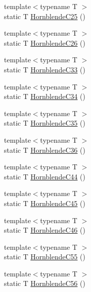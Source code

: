 \begin{DoxyCompactItemize}
\item 
{\footnotesize template$<$typename T $>$ }\\static T \mbox{\hyperlink{namespacempc_1_1data_ab66bbf01d7d0864eb98b3fa93260a745}{Hornblende\+C25}} ()
\item 
{\footnotesize template$<$typename T $>$ }\\static T \mbox{\hyperlink{namespacempc_1_1data_afe3ff9d089373edc9f59f18cf332d248}{Hornblende\+C26}} ()
\item 
{\footnotesize template$<$typename T $>$ }\\static T \mbox{\hyperlink{namespacempc_1_1data_a633fd0ce53057d818dcbb260ee8fa620}{Hornblende\+C33}} ()
\item 
{\footnotesize template$<$typename T $>$ }\\static T \mbox{\hyperlink{namespacempc_1_1data_af11fafc727d70478d7a0ee0c7f1bdffd}{Hornblende\+C34}} ()
\item 
{\footnotesize template$<$typename T $>$ }\\static T \mbox{\hyperlink{namespacempc_1_1data_a2f318bf2ce6b8bdea77f99f8e20329e8}{Hornblende\+C35}} ()
\item 
{\footnotesize template$<$typename T $>$ }\\static T \mbox{\hyperlink{namespacempc_1_1data_a58a1073e772be2c543e3a3ce756e08bf}{Hornblende\+C36}} ()
\item 
{\footnotesize template$<$typename T $>$ }\\static T \mbox{\hyperlink{namespacempc_1_1data_a711981c0ab9a31709771931c708bc731}{Hornblende\+C44}} ()
\item 
{\footnotesize template$<$typename T $>$ }\\static T \mbox{\hyperlink{namespacempc_1_1data_a8b2f87bf61968a18585675bdc0f01c3b}{Hornblende\+C45}} ()
\item 
{\footnotesize template$<$typename T $>$ }\\static T \mbox{\hyperlink{namespacempc_1_1data_af79af0cf116ff23799fbe84e629d2d6e}{Hornblende\+C46}} ()
\item 
{\footnotesize template$<$typename T $>$ }\\static T \mbox{\hyperlink{namespacempc_1_1data_a4563eb08ac0672f5b54cb0ebbe3f72c0}{Hornblende\+C55}} ()
\item 
{\footnotesize template$<$typename T $>$ }\\static T \mbox{\hyperlink{namespacempc_1_1data_a4ffcdae75b9a2bb6129de78381f8be65}{Hornblende\+C56}} ()
\item 

\end{DoxyCompactItemize}
